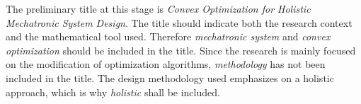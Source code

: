 The preliminary title at this stage is \textit{Convex Optimization for Holistic Mechatronic System Design}.
The title should indicate both the research context and the mathematical tool used. Therefore \textit{mechatronic system} and \textit{convex optimization} should be included in the title. Since the research is mainly focused on the modification of optimization algorithms, \textit{methodology} has not been included in the title. The design methodology used emphasizes on a holistic approach, which is why \textit{holistic} shall be included. 
